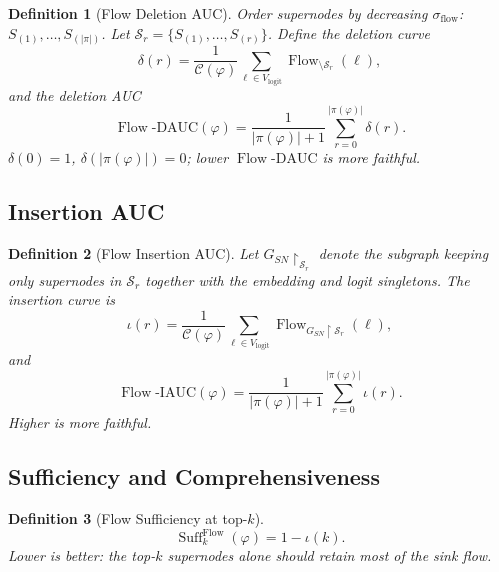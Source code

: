 \documentclass[11pt]{article}
\DeclareMathOperator{\Flow}{Flow}
\DeclareMathOperator{\Suff}{Suff}
\newtheorem{definition}{Definition}
\begin{document}
\begin{definition}[Flow Deletion AUC]\label{def:flow-deletion-auc}
Order supernodes by decreasing $\sigma_{\text{flow}}$:
$S_{(1)}, \ldots, S_{(|\pi|)}$. Let $\mathcal{S}_r = \{S_{(1)}, \ldots, S_{(r)}\}$.
Define the deletion curve
\begin{equation}
\delta(r) = \frac{1}{\mathcal{C}(\varphi)} \sum_{\ell \in V_{\text{logit}}}
\Flow_{\setminus \mathcal{S}_r}(\ell),
\end{equation}
and the deletion AUC
\begin{equation}
\Flow\text{-}\mathrm{DAUC}(\varphi)
= \frac{1}{|\pi(\varphi)| + 1} \sum_{r=0}^{|\pi(\varphi)|} \delta(r).
\label{eq:flow-dauc}
\end{equation}
$\delta(0) = 1$, $\delta(|\pi(\varphi)|) = 0$;
\emph{lower $\Flow\text{-}\mathrm{DAUC}$ is more faithful}.
\end{definition}

\subsection{Insertion AUC}

\begin{definition}[Flow Insertion AUC]\label{def:flow-insertion-auc}
Let $G_{SN}\!\restriction_{\mathcal{S}_r}$ denote the subgraph
keeping only supernodes in $\mathcal{S}_r$ together with the
embedding and logit singletons. The insertion curve is
\begin{equation}
\iota(r) = \frac{1}{\mathcal{C}(\varphi)} \sum_{\ell \in V_{\text{logit}}}
\Flow_{G_{SN}\restriction \mathcal{S}_r}(\ell),
\end{equation}
and
\begin{equation}
\Flow\text{-}\mathrm{IAUC}(\varphi)
= \frac{1}{|\pi(\varphi)| + 1} \sum_{r=0}^{|\pi(\varphi)|} \iota(r).
\label{eq:flow-iauc}
\end{equation}
\emph{Higher is more faithful.}
\end{definition}

\subsection{Sufficiency and Comprehensiveness}

\begin{definition}[Flow Sufficiency at top-$k$]\label{def:flow-suff}
\begin{equation}
\Suff_k^{\Flow}(\varphi) = 1 - \iota(k).
\label{eq:flow-suff}
\end{equation}
Lower is better: the top-$k$ supernodes alone should retain most of
the sink flow.
\end{definition}
\end{document}
